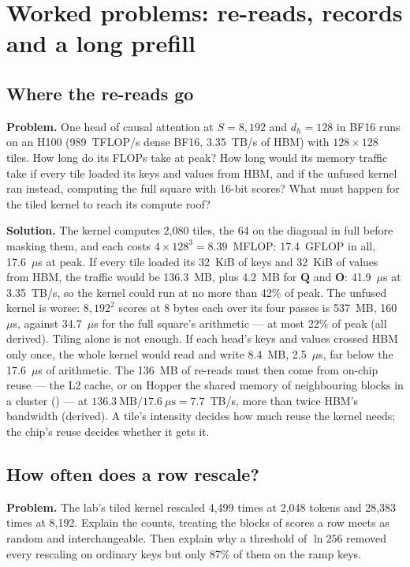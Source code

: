 \section{Worked problems: re-reads, records and a long prefill}

\subsection{Where the re-reads go}
\textbf{Problem.} One head of causal attention at $S = 8{,}192$ and $d_h = 128$ in
BF16 runs on an H100 (989~TFLOP/s dense BF16, 3.35~TB/s of HBM) with
$128 \times 128$ tiles. How long do its FLOPs take at peak? How long would its
memory traffic take if every tile loaded its keys and values from HBM, and if
the unfused kernel ran instead, computing the full square with 16-bit scores?
What must happen for the tiled kernel to reach its compute roof?

\textbf{Solution.} The kernel computes 2,080 tiles, the 64 on the diagonal in
full before masking them, and each costs $4 \times 128^3 = 8.39$~MFLOP: 17.4~GFLOP
in all, 17.6~$\mu$s at peak. If every tile loaded its 32~KiB of keys and 32~KiB
of values from HBM, the traffic would be 136.3~MB, plus 4.2~MB for $\mathbf{Q}$
and $\mathbf{O}$: 41.9~$\mu$s at 3.35~TB/s, so the kernel could run at no more
than 42\% of peak. The unfused kernel is worse: $8{,}192^2$ scores at 8 bytes
each over its four passes is 537~MB, 160~$\mu$s, against 34.7~$\mu$s for the
full square's arithmetic --- at most 22\% of peak (all derived). Tiling alone
is not enough. If each head's keys and values crossed HBM only once, the whole
kernel would read and write 8.4~MB, 2.5~$\mu$s, far below the 17.6~$\mu$s of
arithmetic. The 136~MB of re-reads must then come from on-chip reuse --- the
L2 cache, or on Hopper the shared memory of neighbouring blocks in a cluster
() --- at $136.3~\text{MB} / 17.6~\mu\text{s} = 7.7$~TB/s,
more than twice HBM's bandwidth (derived). A tile's intensity decides how much
reuse the kernel needs; the chip's reuse decides whether it gets it.

\subsection{How often does a row rescale?}
\textbf{Problem.} The lab's tiled kernel rescaled 4,499 times at 2,048 tokens and
28,383 times at 8,192. Explain the counts, treating the blocks of scores a row
meets as random and interchangeable. Then explain why a threshold of $\ln 256$
removed every rescaling on ordinary keys but only 87\% of them on the ramp keys.

